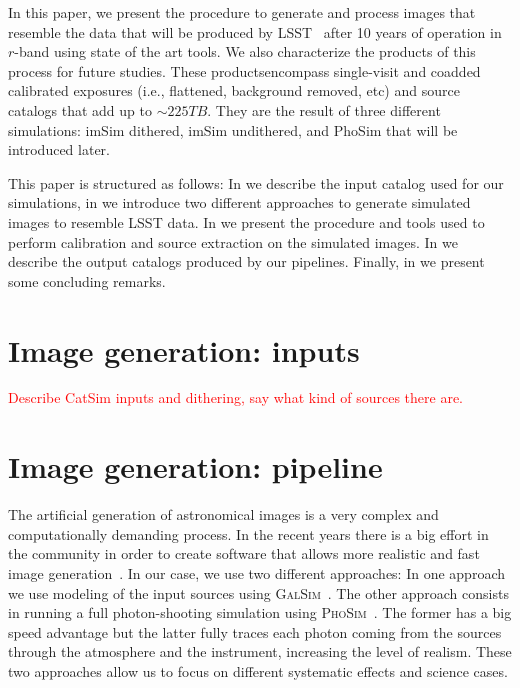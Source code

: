\documentclass[\docopts]{\docclass}
\begin{document}
In this paper, we present the procedure to generate and process images that resemble the data that will be produced by
LSST~\citep{2008arXiv0805.2366I} after 10 years of operation in $r$-band using state of the art tools. We also characterize
the products of this process for future studies. These productsencompass single-visit and coadded calibrated exposures
(i.e., flattened, background removed, etc) and source catalogs that add up to $\sim 225 TB$. They are the result of three
different simulations: imSim dithered, imSim undithered, and PhoSim that will be introduced later.

This paper is structured as follows: In  we describe the input catalog used for our simulations,
in  we introduce two different approaches to generate simulated images to
resemble LSST data. In  we present the procedure and tools used to perform
calibration and source extraction on the simulated images. In  we describe the output catalogs
produced by our pipelines. Finally, in  we present some concluding remarks.

\section{Image generation: inputs}
\label{sec:inputs}

\textcolor{red}{Describe CatSim inputs and dithering, say what kind of sources there are.}

\section{Image generation: pipeline}
\label{sec:image_generation_pipeline}

The artificial generation of astronomical images is a very complex and computationally demanding process. In the recent
years there is a big effort in the community in order to create software that allows more realistic and fast image
generation~\citep{2016MNRAS.457..786S,2016ApJ...817...25B}. In our case, we use two different approaches: In one approach
we use modeling of the input sources using \textsc{GalSim}~\citep{2015A&C....10..121R}. The other approach consists in
running a full photon-shooting simulation using \textsc{PhoSim}~\citep{2015ApJS..218...14P}. The former has a big speed
advantage but the latter fully traces each photon coming from the sources through the atmosphere and the instrument,
increasing the level of realism. These two approaches allow us to focus on different systematic effects and science cases.
\end{document}
